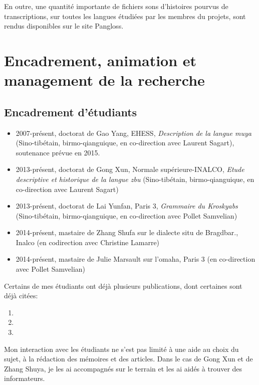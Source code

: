 \documentclass[oldfontcommands,oneside,a4paper,11pt]{article}
\begin{document}
En outre, une quantité importante de fichiers sons d'histoires pourvus de transcriptions, sur toutes les langues étudiées par les membres du projets, sont rendus disponibles sur le site Pangloss.

\section{Encadrement, animation et management de la recherche}
\subsection{Encadrement d'étudiants}
\begin{itemize}
\item 2007-présent, doctorat de Gao Yang, EHESS, \textit{Description de la langue muya} (Sino-tibétain, birmo-qianguique, en co-direction avec Laurent Sagart), soutenance prévue en 2015.
\item 2013-présent, doctorat de Gong Xun, Normale supérieure-INALCO, \textit{Etude descriptive et historique de la langue zbu} (Sino-tibétain, birmo-qianguique, en co-direction avec Laurent Sagart)
\item 2013-présent, doctorat de Lai Yunfan, Paris 3, \textit{Grammaire du Kroskyabs} (Sino-tibétain, birmo-qianguique, en co-direction avec Pollet Samvelian)
\item 2014-présent, mastaire de Zhang Shufa sur le dialecte situ de Bragdbar., Inalco (en codirection avec Christine Lamarre)
\item 2014-présent, mastaire de Julie Marsault sur l'omaha, Paris 3 (en co-direction avec Pollet Samvelian)
\end{itemize}

Certains de mes étudiants ont déjà plusieurs publications, dont certaines sont déjà citées:

\begin{enumerate}
 \item  {}
 \item {}
  \item {}
\end{enumerate}

Mon interaction avec les étudiants ne s'est pas limité à une aide au choix du sujet, à la rédaction des mémoires et des articles. Dans le cas de Gong Xun et de Zhang Shuya, je les ai accompagnés sur le terrain et les ai aidés à trouver des informateurs.
\end{document}
